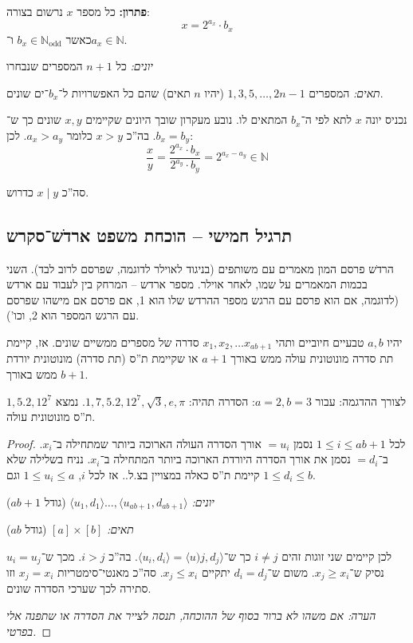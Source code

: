 \documentclass[]{article}
\newcommand\N     {\mathbb{N}}
\newcommand\Nodd  {\N_{\mathrm{odd }}}
\newcommand\ra    {\rangle}
\newcommand\la    {\langle}
\begin{document}
	\textbf{פתרון: }כל מספר $x$ נרשום בצורה: 
	\[ x = 2^{a_x} \cdot b_x \]
	כאשר $b_x \in \Nodd$ ו־$a_x \in \N$. 
	
	\textit{יונים: }כל $n + 1 $ המספרים שנבחרו
	
	\textit{תאים: }המספרים $1, 3, 5, \dots, 2n - 1$ (יהיו $n$ תאים) שהם כל האפשרויות ל־$b_x$־ים שונים. 
	
	נכניס יונה $x$ לתא לפי ה־$b_x$ המתאים לו. נובע מעקרון שובך היונים שקיימים $x, y$ שונים כך ש־$b_x = b_y$. בה''כ $x > y$ כלומר $a_x > a_y$. לכן: 
	\[ \frac{x}{y} = \frac{2^{a_x} \cdot b_x}{2^{a_y} \cdot b_y} = 2^{a_x - a_y} \in \N \]
	
	סה''כ $x \mid y $ כדרוש. 
	\subsection{תרגיל חמישי – הוכחת משפט ארדֹש־סקרש}
	הרדֹש פרסם המון מאמרים עם משותפים (בניגוד לאוילר לדוגמה, שפרסם לרוב לבד). השני בכמות המאמרים על שמו, לאחר אוילר. מספר ארדש – המרחק בין לעבוד עם ארדש (לדוגמה, אם הוא פרסם עם הרגש מספר ההרדש שלו הוא 1, אם פרסם אם מישהו שפרסם עם הרגש המספר הוא 2, וכו'). 
	
	יהיו $a, b$ טבעיים חיוביים ותהי $x_1, x_2, \dots x_{ab + 1} $ סדרה של מספרים ממשיים שונים. אז, קיימת תת סדרה מונוטונית עולה ממש באורך $a + 1$ או שקיימת ת''ס (תת סדרה) מונוטונית יורדת ממש באורך $b + 1 $. 
	
	לצורך ההדגמה: עבור $a = 2, b = 3 $: הסדרה תהיה: $1, 7, 5.2, 12^7, \sqrt3, e, \pi$. נמצא $1, 5.2, 12^7 $ ת''ס מונוטונית עולה. 
	
	\begin{proof}
		לכל $1 \le i \le ab + 1$ נסמן $= u_i$ אורך הסדרה העולה הארוכה ביותר שמתחילה ב־$x_i$. ב־$= d_i$ נסמן את אורך הסדרה היורדת הארוכה ביותר המתחילה ב־$x_i$. נניח בשלילה שלא קיימת ת''ס כאלה במצויין בצ.ל.. אז לכל $i$, $1 \le u_i \le a$ וגם $1 \le d_i \le b$. 
		
		\textit{יונים: }$\la u_1, d_1 \ra \dots, \la u_{ab + 1}, d_{ab + 1} \ra$ (גודל $ab + 1$)
		
		\textit{תאים: }$[a] \times [b]$ (גודל $ab$)
		
		לכן קיימים שני זוגות זהים $i \neq j$ כך ש־$\la u_i, d_i \ra = \la u)j, d_j \ra$. בה''כ $i > j$. מכך ש־$u_i = u_j$ נסיק ש־$x_j \ge x_i$. משום ש־$d_i = d_j$ יתקיים $x_j \le x_i$. סה''כ מאנטי־סימטריות $x_j = x_i$ וזו סתירה לכך שערכי הסדרה שונים. 
		
		\textit{הערה: אם משהו לא ברור בסוף של ההוכחה, תנסה לצייר את הסדרה או שתפנה אלי בפרטי. }
	\end{proof}	
	
\end{document}
